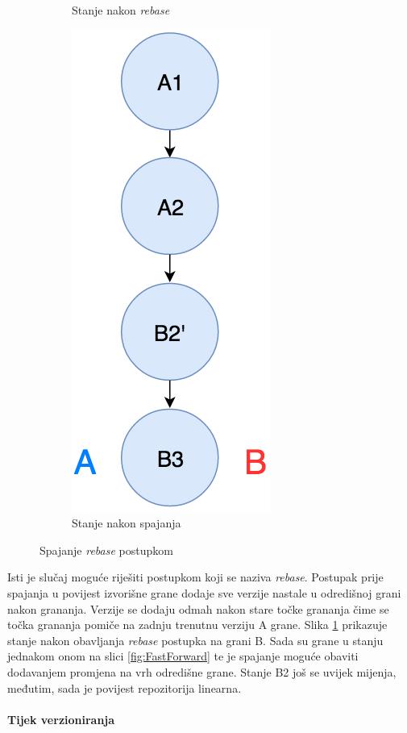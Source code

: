 \documentclass[times, utf8, diplomski, numeric]{fer}
\begin{document}
\begin{figure}[b!]
\begin{subfigure}{.3\textwidth}
\caption{Stanje nakon \textit{rebase}}
\label{fig:RebaseB}
\end{subfigure}
\begin{subfigure}{.3\textwidth}
\centering
\includegraphics[scale=0.5]{RebaseC}
\caption{Stanje nakon spajanja}
\label{fig:RebaseC}
\end{subfigure}
\caption{Spajanje \textit{rebase} postupkom}
\label{fig:Rebase}
\end{figure}

Isti je slučaj moguće riješiti postupkom koji se naziva \textit{rebase}. Postupak prije spajanja u povijest izvorišne grane dodaje sve verzije nastale u odredišnoj grani nakon grananja. Verzije se dodaju odmah nakon stare točke grananja čime se točka grananja pomiče na zadnju trenutnu verziju A grane. Slika \ref{fig:RebaseB} prikazuje stanje nakon obavljanja \textit{rebase} postupka na grani B. Sada su grane u stanju jednakom onom na slici \ref{fig:FastForward} te je spajanje moguće obaviti dodavanjem promjena na vrh odredišne grane. Stanje B2 još se uvijek mijenja, međutim, sada je povijest repozitorija linearna.

\paragraph{Tijek verzioniranja} \label{header:Implementacija_verzioniranja}
\end{document}
